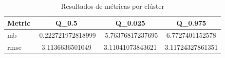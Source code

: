 \begin{table}[h]\centering
\begin{tabular}{lccc}
Metric & Q_0.5 & Q_0.025 & Q_0.975 \\ \hline
mb & -0.222721972818999 & -5.76376817237695 & 6.7727401152578 \\ 
rmse & 3.1136636501049 & 3.11041073843621 & 3.11724327861351 \\ 
\end{tabular}
\caption{Resultados de métricas por clúster}
\label{tab:cluster_metrics}
\end{table}
